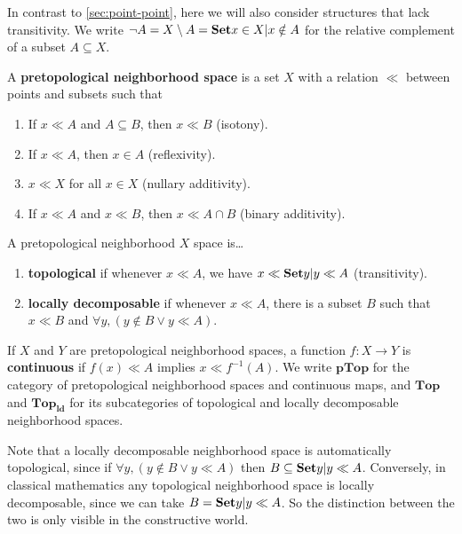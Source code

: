 \documentclass{article}
\def\cpl#1{\neg #1}
\def\inv{^{-1}}
\def\nn{\ensuremath{\neg\neg}}
\def\PTop{\mathbf{pTop}}
\def\Top{\mathbf{Top}}
\def\PTopnn{\mathbf{pTop}_{\nn}}
\def\ldTop{\mathbf{Top}_{\mathbf{ld}}}
\begin{document}
In contrast to \cref{sec:point-point}, here we will also consider structures that lack transitivity.
We write $\cpl{A} = X\setminus A = \setof{x\in X | x\notin A}$ for the relative complement of a subset $A\subseteq X$.

\begin{defn}
  A \textbf{pretopological neighborhood space} is a set $X$ with a relation $\ll$ between points and subsets such that
  \begin{enumerate}
  \item If $x\ll A$ and $A\subseteq B$, then $x\ll B$ (isotony).
  \item If $x\ll A$, then $x\in A$ (reflexivity).
  \item $x\ll X$ for all $x\in X$ (nullary additivity).
  \item If $x\ll A$ and $x\ll B$, then $x\ll A\cap B$ (binary additivity).
  \end{enumerate}
  A pretopological neighborhood $X$ space is\dots
  \begin{enumerate}[resume]
  \item \textbf{topological} if whenever $x\ll A$, we have $x \ll \setof{ y | y\ll A}$ (transitivity).
  \item \textbf{locally decomposable} if whenever $x\ll A$, there is a subset $B$ such that $x\ll B$ and $\forall y, (y\notin B \lor y \ll A)$.
  \end{enumerate}
  If $X$ and $Y$ are pretopological neighborhood spaces, a function $f:X\to Y$ is \textbf{continuous} if $f(x)\ll A$ implies $x\ll f\inv(A)$.
  We write $\PTop$ for the category of pretopological neighborhood spaces and continuous maps, and $\Top$
  and $\ldTop$ for its subcategories of topological %
  and locally decomposable neighborhood spaces.
\end{defn}

Note that a locally decomposable neighborhood space is automatically topological, %
since if $\forall y, (y\notin B \lor y \ll A)$ then %
$B \subseteq \setof{ y | y\ll A}$.
Conversely, in classical mathematics any topological neighborhood space is locally decomposable, since we can take $B = \setof{ y | y\ll A}$.
So the distinction between the two is only visible in the constructive world.
\end{document}
